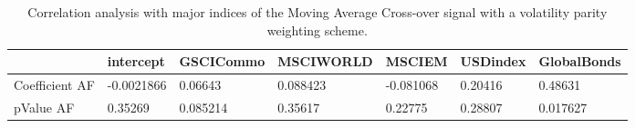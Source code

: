 \begin{table}[H]
\centering
\begin{tabular}{lllllll}
\hline& intercept & GSCICommo & MSCIWORLD & MSCIEM & USDindex & GlobalBonds \\ 
\hline 
Coefficient AF & -0.0021866 & 0.06643 & 0.088423 & -0.081068 & 0.20416 & 0.48631 \\ 
pValue AF & 0.35269 & 0.085214 & 0.35617 & 0.22775 & 0.28807 & 0.017627 \\ 
\hline
\end{tabular}
\caption{Correlation analysis with major indices of the Moving Average Cross-over signal with a volatility parity weighting scheme.}
\label{MAVP_AFACTOR}
\end{table}